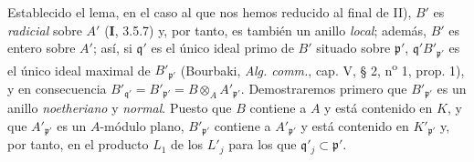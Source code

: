 Establecido el lema, en el caso al que nos hemos reducido al final
de II), $B'$ es \emph{radicial} sobre $A'$ (\textbf{I}, 3.5.7) y, por tanto, es también
un anillo \emph{local}; además, $B'$ es entero sobre $A'$; así, si
$\mathfrak q'$ es el único ideal primo de $B'$ situado sobre
$\mathfrak p'$, $\mathfrak q'B'_{\mathfrak p'}$ es el único ideal
maximal de $B'_{\mathfrak p'}$ (Bourbaki, \emph{Alg. comm.}, cap. V, § 2,
n\textsuperscript{o} 1, prop. 1), y en consecuencia
$B'_{\mathfrak q'}=B'_{\mathfrak p'}=B\otimes_A
A'_{\mathfrak p'}$. Demostraremos primero que
$B'_{\mathfrak p'}$ es un anillo \emph{noetheriano} y \emph{normal}. Puesto que $B$
contiene a $A$ y está contenido en $K$, y que $A'_{\mathfrak p'}$ es
un $A$-módulo plano, $B'_{\mathfrak p'}$ contiene a
$A'_{\mathfrak p'}$ y está contenido en $K'_{\mathfrak p'}$ y, por
tanto, en el producto $L_1$ de los $L'_j$ para los que
$\mathfrak q'_j\subset\mathfrak p'$.
